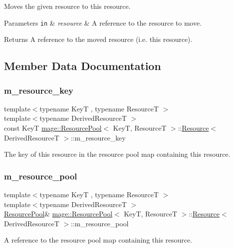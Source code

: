 Moves the given resource to this resource.


\begin{DoxyParams}[1]{Parameters}
\mbox{\tt in}  & {\em resource} & A reference to the resource to move. \\
\hline
\end{DoxyParams}
\begin{DoxyReturn}{Returns}
A reference to the moved resource (i.\+e. this resource). 
\end{DoxyReturn}


\subsection{Member Data Documentation}
\hypertarget{structmage_1_1_resource_pool_1_1_resource_a7980e0160d7b3ff4fc70ec4deabb443c}{}\label{structmage_1_1_resource_pool_1_1_resource_a7980e0160d7b3ff4fc70ec4deabb443c} 
\subsubsection{\texorpdfstring{m\+\_\+resource\+\_\+key}{m\_resource\_key}}
{\footnotesize\ttfamily template$<$typename KeyT , typename ResourceT $>$ \\
template$<$typename Derived\+ResourceT $>$ \\
const KeyT \hyperlink{classmage_1_1_resource_pool}{mage\+::\+Resource\+Pool}$<$ KeyT, ResourceT $>$\+::\hyperlink{structmage_1_1_resource_pool_1_1_resource}{Resource}$<$ Derived\+ResourceT $>$\+::m\+\_\+resource\+\_\+key\hspace{0.3cm}{\ttfamily [private]}}

The key of this resource in the resource pool map containing this resource. \hypertarget{structmage_1_1_resource_pool_1_1_resource_a9e5b68fd638ed6bd3b271afff834aced}{}\label{structmage_1_1_resource_pool_1_1_resource_a9e5b68fd638ed6bd3b271afff834aced} 
\subsubsection{\texorpdfstring{m\+\_\+resource\+\_\+pool}{m\_resource\_pool}}
{\footnotesize\ttfamily template$<$typename KeyT , typename ResourceT $>$ \\
template$<$typename Derived\+ResourceT $>$ \\
\hyperlink{classmage_1_1_resource_pool}{Resource\+Pool}\& \hyperlink{classmage_1_1_resource_pool}{mage\+::\+Resource\+Pool}$<$ KeyT, ResourceT $>$\+::\hyperlink{structmage_1_1_resource_pool_1_1_resource}{Resource}$<$ Derived\+ResourceT $>$\+::m\+\_\+resource\+\_\+pool\hspace{0.3cm}{\ttfamily [private]}}

A reference to the resource pool map containing this resource. 